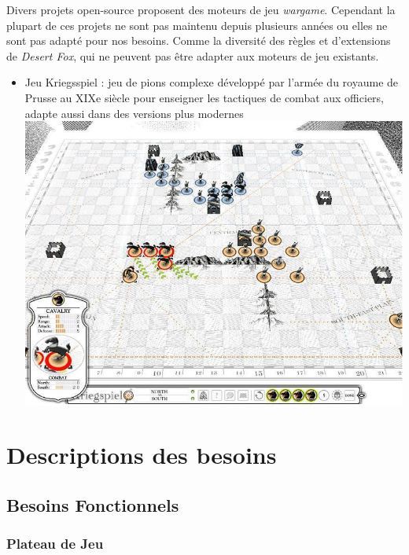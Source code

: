\documentclass{article}[a4paper, 12pt]
\begin{document}
Divers projets open-source proposent des moteurs de jeu \emph{wargame}. Cependant la plupart de ces projets ne sont pas maintenu depuis plusieurs années ou elles ne sont pas adapté pour nos besoins. Comme la diversité des règles et d'extensions de \emph{Desert Fox}, qui ne peuvent pas être adapter aux moteurs de jeu existants.

\begin{itemize}
    \item Jeu Kriegsspiel : jeu de pions complexe développé par l'armée du royaume de Prusse au XIXe siècle pour enseigner les tactiques de combat aux officiers, adapte aussi dans des versions plus modernes \cite{livermore1879american}\\
   \includegraphics[scale=0.5]{kriegspiel.jpeg}
    
    
\end{itemize}


\section{Descriptions des besoins}
\subsection{Besoins Fonctionnels}
\subsubsection{Plateau de Jeu}
\end{document}
